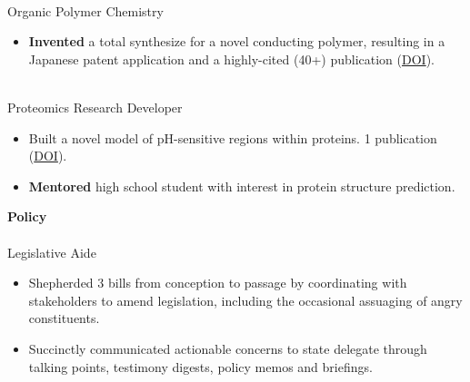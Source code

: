 \documentclass[margin]{res}
\begin{document}
\begin{sloppypar}
\begin{resume}
 \\
Organic Polymer Chemistry
\begin{itemize}
    \item \textbf{Invented} a total synthesize for a novel conducting polymer, resulting in a Japanese patent application and a highly-cited (40+) publication (\href{http://pubs.acs.org/doi/abs/10.1021/ja107444m}{DOI}).
\end{itemize}

 \\
Proteomics Research Developer
\begin{itemize}
\item Built a novel model of pH-sensitive regions within proteins. 1 publication (\href{http://dx.doi.org/10.1016/j.bpj.2012.06.044}{DOI}).
\item \textbf{Mentored} high school student with interest in protein structure prediction.
\end{itemize}

\textbf{Policy} \\
 \\
Legislative Aide
\begin{itemize}
    \item Shepherded 3 bills from conception to passage by coordinating with stakeholders to amend legislation, including the occasional assuaging of angry constituents.
    \item Succinctly communicated actionable concerns to state delegate through talking points, testimony digests, policy memos and briefings.
\end{itemize}


\end{resume}
\end{sloppypar}
\end{document}
